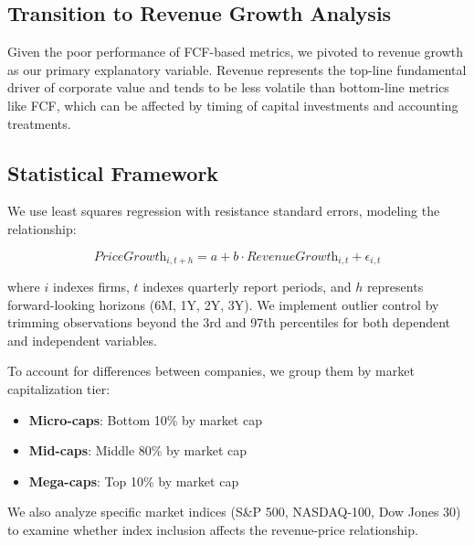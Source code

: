 \documentclass[11pt]{article}
\begin{document}
\subsection{Transition to Revenue Growth Analysis}

Given the poor performance of FCF-based metrics, we pivoted to revenue growth as our primary explanatory variable. Revenue represents the top-line fundamental driver of corporate value and tends to be less volatile than bottom-line metrics like FCF, which can be affected by timing of capital investments and accounting treatments.

\subsection{Statistical Framework}

We use least squares regression with resistance standard errors, modeling the relationship:

\begin{equation}
\textit{PriceGrowth}_{i,t+h} = a + b \cdot \textit{RevenueGrowth}_{i,t} + \epsilon_{i,t}
\end{equation}

where $i$ indexes firms, $t$ indexes quarterly report periods, and $h$ represents forward-looking horizons (6M, 1Y, 2Y, 3Y). We implement outlier control by trimming observations beyond the 3rd and 97th percentiles for both dependent and independent variables.

To account for differences between companies, we group them by market capitalization tier:
\begin{itemize}
\item \textbf{Micro-caps}: Bottom 10\% by market cap
\item \textbf{Mid-caps}: Middle 80\% by market cap  
\item \textbf{Mega-caps}: Top 10\% by market cap
\end{itemize}

We also analyze specific market indices (S\&P 500, NASDAQ-100, Dow Jones 30) to examine whether index inclusion affects the revenue-price relationship.


\end{document}
